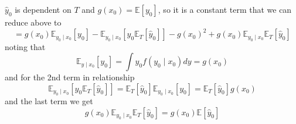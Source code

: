 \documentclass{beamer}
\newcommand{\E}{\mathbb{E}}
\begin{document}
\begin{frame}
$\hat{y}_0$ is dependent on $T$ and $g(x_0)=\E[y_0]$, so it is a constant term that we can reduce above to
\[
=g(x_0)\E_{y_0\mid x_0}[y_0]-\E_{y_0\mid x_0}[y_0\E_T[\hat{y}_0]]-g(x_0)^2+g(x_0)\E_{y_0\mid x_0}\E_T[\hat{y}_0]
\]
noting that
\[
\E_{y\mid x_0}[y_0]=\int y_0 f(y_0\mid x_0)dy=g(x_0)
\]
and for the 2nd term in relationship
\[
\E_{y_0\mid x_0}[y_0\E_T[\hat{y}_0]]=\E_T[\hat{y}_0]\E_{y_0\mid x_0}[y_0]=\E_T[\hat{y}_0]g(x_0)
\]
and the last term we get
\[
g(x_0)\E_{y_0\mid x_0}\E_T[\hat{y}_0]=g(x_0)\E[\hat{y}_0]
\]
\end{frame}
%
%
\end{document}
